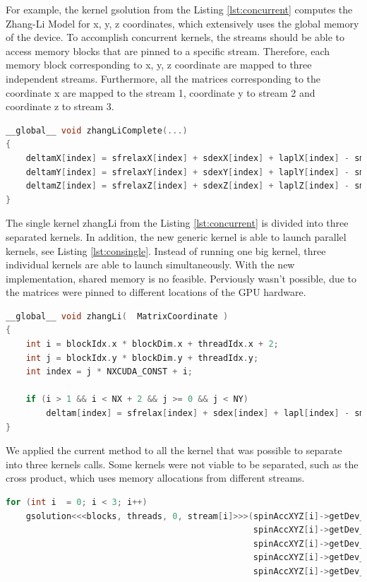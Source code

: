 For example, the kernel {\listf gsolution} from the Listing \ref{lst:concurrent} computes the Zhang-Li Model for x, y, z coordinates, which extensively uses the global memory of the device. To accomplish concurrent kernels, the streams should be able to access memory blocks that are pinned to a specific stream. Therefore, each memory block corresponding to x, y, z coordinate are mapped to three independent streams. Furthermore, all the matrices corresponding to the coordinate x are mapped to the stream 1, coordinate y to stream 2 and coordinate z to stream 3.

\begin{lstlisting}[language=C++, label={lst:concurrent}, caption={Evaluation of x, y, z coordinates of the Zhang-Li Model in a single kernel.}]
__global__ void zhangLiComplete(...)
{
	deltamX[index] = sfrelaxX[index] + sdexX[index] + laplX[index] - smX[index];
	deltamY[index] = sfrelaxY[index] + sdexY[index] + laplY[index] - smY[index];
	deltamZ[index] = sfrelaxZ[index] + sdexZ[index] + laplZ[index] - smZ[index];
}
\end{lstlisting}
 
The single kernel {\listf zhangLi} from the Listing \ref{lst:concurrent} is divided into three separated kernels. In addition, the new generic kernel is able to launch parallel kernels, see Listing \ref{lst:consingle}. Instead of running one big kernel, three individual kernels are able to launch simultaneously. With the new implementation, shared memory is no feasible. Perviously wasn't possible, due to the matrices were pinned to different locations of the GPU hardware. 

\begin{lstlisting}[language=C++, label={lst:consingle}, caption={Evaluation of individual coordinates of the Zhang-Li Model.}]
__global__ void zhangLi(  MatrixCoordinate )
{
	int i = blockIdx.x * blockDim.x + threadIdx.x + 2;
	int j = blockIdx.y * blockDim.y + threadIdx.y;
	int index = j * NXCUDA_CONST + i;

	if (i > 1 && i < NX + 2 && j >= 0 && j < NY)
		deltam[index] = sfrelax[index] + sdex[index] + lapl[index] - sm[index];
}
\end{lstlisting}

We applied the current method to all the kernel that was possible to separate into three kernels calls. Some kernels were not viable to be separated, such as the cross product, which uses memory allocations from different streams.

\begin{lstlisting}[language=C++, caption={Evaluate Zhang-Li Model.}]
for (int i  = 0; i < 3; i++)
	gsolution<<<blocks, threads, 0, stream[i]>>>(spinAccXYZ[i]->getDev_deltam(),
												 spinAccXYZ[i]->getDev_sfrelax(), 
												 spinAccXYZ[i]->getDev_sm(), 
											 	 spinAccXYZ[i]->getDev_sdex(),
											 	 spinAccXYZ[i]->getDev_lapl());
\end{lstlisting}

